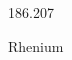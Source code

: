 \documentclass[12pt]{article}
\begin{document}
\hfill{}
\vfill
\begin{center}
  {\fontsize{50}{60}
  }

  \vspace{1em}

  186.207

Rhenium
\end{center}
\vfill
\end{document}
